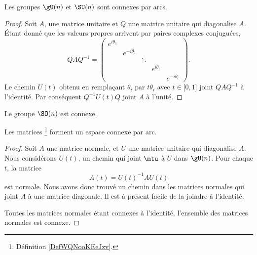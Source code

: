 \begin{lemma}       \label{LEMooQMXHooZQozMK}
    Les groupes \( \gU(n)\) et \( \SU(n)\) sont connexes par arcs.
\end{lemma}

\begin{proof}
    Soit \( A\), une matrice unitaire et \( Q\) une matrice unitaire qui diagonalise \( A\). Étant donné que les valeurs propres arrivent par paires complexes conjuguées,
    \begin{equation}
        QAQ^{-1}=\begin{pmatrix}
            e^{i\theta_1}    &       &       &       &   \\  
            &    e^{-i\theta_1}    &       &       &   \\  
            &       &    \ddots    &       &   \\  
            &       &       &    e^{i\theta_r}    &   \\  
            &       &       &       &        e^{-i\theta_r}
        \end{pmatrix}.
    \end{equation}
    Le chemin \( U(t)\) obtenu en remplaçant \( \theta_i\) par \( t\theta_i\) avec \( t\in\mathopen[ 0 , 1 \mathclose]\) joint \( QAQ^{-1}\) à l'identité. Par conséquent \( Q^{-1}U(t)Q\) joint \( A\) à l'unité.
\end{proof}

\begin{proposition}     \label{PROPooYKMAooCuLtyh}
    Le groupe \( \SO(n)\) est connexe.
\end{proposition}

\begin{theorem}
    Les matrices \footnote{Définition \ref{DefWQNooKEeJzv}.} forment un espace connexe par arc.
\end{theorem}

\begin{proof}
    Soit \( A\) une matrice normale, et \( U\) une matrice unitaire qui diagonalise \( A\). Nous considérons \( U(t)\), un chemin qui joint \( \mtu\) à \( U\) dans \( \gU(n)\). Pour chaque \( t\), la matrice
    \begin{equation}
        A(t)=U(t)^{-1} AU(t)
    \end{equation}
    est normale. Nous avons donc trouvé un chemin dans les matrices normales qui joint \( A\) à une matrice diagonale. Il est à présent facile de la joindre à l'identité.

    Toutes les matrices normales étant connexes à l'identité, l'ensemble des matrices normales est connexe.
\end{proof}

